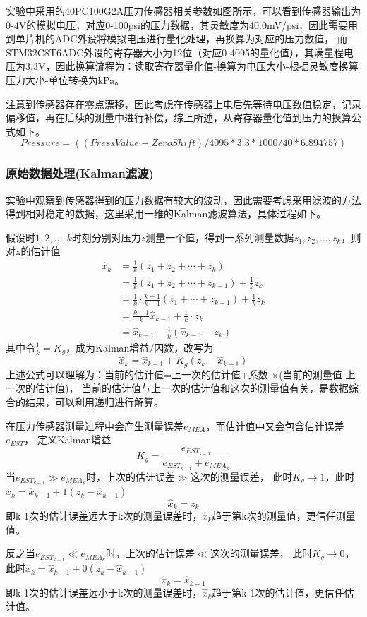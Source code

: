 \documentclass[11pt, a4paper, oneside]{ctexart}
\begin{document}
实验中采用的40PC100G2A压力传感器相关参数如图所示，可以看到传感器输出为0-4V的模拟电压，对应0-100psi的压力数据，其灵敏度为40.0mV/psi，因此需要用到单片机的ADC外设将模拟电压进行量化处理，再换算为对应的压力数值，
而STM32C8T6ADC外设的寄存器大小为12位（对应0-4095的量化值），其满量程电压为3.3V，因此换算流程为：读取寄存器量化值-换算为电压大小-根据灵敏度换算压力大小-单位转换为kPa。

注意到传感器存在零点漂移，因此考虑在传感器上电后先等待电压数值稳定，记录偏移值，再在后续的测量中进行补偿，综上所述，从寄存器量化值到压力的换算公式如下。
$$
Pressure = ((PressValue - ZeroShift) / 4095 * 3.3 * 1000 / 40 * 6.894757)
$$
\subsubsection{原始数据处理(Kalman滤波)}
实验中观察到传感器得到的压力数据有较大的波动，因此需要考虑采用滤波的方法得到相对稳定的数据，这里采用一维的Kalman滤波算法，具体过程如下。

假设时$1,2,...,k$时刻分别对压力$z$测量一个值，得到一系列测量数据$z_1,z_2,...,z_k$，则对x的估计值
$$
\begin{aligned}
    \hat{x}_{k}& =\frac{1}{k}(z_{1}+z_{2}+\cdots+z_{k})  \\
    &=\frac{1}{k}(z_{1}+z_{2}+\cdots+z_{k-1})+\frac{1}{k}z_{k} \\
    &=\frac{1}{k}\cdot\frac{k-1}{k-1}(z_{1}+\cdots+z_{k-1})+\frac{1}{k}z_{k} \\
    &=\frac{k-1}{k}\hat x_{k-1}+\frac{1}{k}\cdot z_{k} \\
    &=\hat{x}_{k-1}-\frac{1}{k}(\hat{x}_{k-1}-z_{k})
\end{aligned}
$$
其中令$\frac{1}{k}=K_g$，成为Kalman增益/因数，改写为
$$
\hat x_k=\hat x_{k-1} + K_g(z_k - \hat x_{k-1})
$$
上述公式可以理解为：当前的估计值=上一次的估计值+系数 $\times$(当前的测量值-上一次的估计值)，
当前的估计值与上一次的估计值和这次的测量值有关，是数据综合的结果，可以利用递归进行解算。

在压力传感器测量过程中会产生测量误差$e_{MEA}$，而估计值中又会包含估计误差$e_{EST}$，
定义Kalman增益
$$
K_g=\frac{e_{EST_{k-1}}}{e_{EST_{k-1}}+e_{MEA_k}}
$$
当$e_{EST_{k-1}}\gg e_{MEA_k}$时，上次的估计误差$\gg$这次的测量误差，
此时$K_g\to 1$，此时$\hat x_k=\hat x_{k-1} + 1(z_k - \hat x_{k-1})$
$$
\hat x_k=z_k
$$
即k-1次的估计误差远大于k次的测量误差时，$\hat x_k$趋于第k次的测量值，更信任测量值。

反之当$e_{EST_{k-1}}\ll e_{MEA_k}$时，上次的估计误差$\ll$这次的测量误差，
此时$K_g\to 0$，此时$\hat x_k=\hat x_{k-1} + 0(z_k - \hat x_{k-1})$
$$
\hat x_k=\hat x_{k-1}
$$
即k-1次的估计误差远小于k次的测量误差时，$\hat x_k$趋于第k-1次的估计值，更信任估计值。
\end{document}
